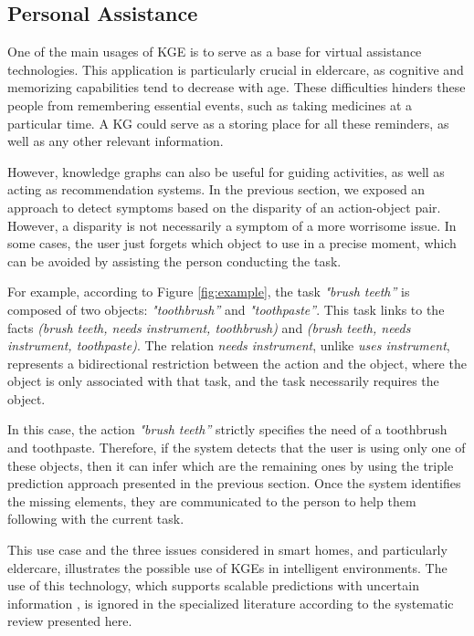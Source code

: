 \subsection{Personal Assistance}
One of the main usages of KGE is to serve as a base for virtual assistance technologies. This application is particularly crucial in eldercare, as cognitive and memorizing capabilities tend to decrease with age. These difficulties hinders these people from remembering essential events, such as taking medicines at a particular time. A KG could serve as a storing place for all these reminders, as well as any other relevant information.

However, knowledge graphs can also be useful for guiding activities, as well as acting as recommendation systems. In the previous section, we exposed an approach to detect symptoms based on the disparity of an action-object pair. However, a disparity is not necessarily a symptom of a more worrisome issue. In some cases, the user just forgets which object to use in a precise moment, which can be avoided by assisting the person conducting the task. 

For example, according to Figure \ref{fig:example}, the task \textit{"brush teeth''} is composed of two objects: \textit{"toothbrush''} and \textit{"toothpaste''}. This task links to the facts \textit{(brush teeth, needs instrument, toothbrush)} and \textit{(brush teeth, needs instrument, toothpaste)}. The relation \textit{needs instrument}, unlike \textit{uses instrument}, represents a bidirectional restriction between the action and the object, where the object is only associated with that task, and the task necessarily requires the object. 

In this case, the action \textit{"brush teeth''} strictly specifies the need of a toothbrush and toothpaste. Therefore, if the system detects that the user is using only one of these objects, then it can infer which are the remaining ones by using the triple prediction approach presented in the previous section. Once the system identifies the missing elements, they are communicated to the person to help them following with the current task.

This use case and the three issues considered in smart homes, and particularly eldercare, illustrates the possible use of KGEs in intelligent environments. The use of this technology, which supports scalable predictions with uncertain information \citep{WangMWG17}, is ignored in the specialized literature according to the systematic review presented here. 



